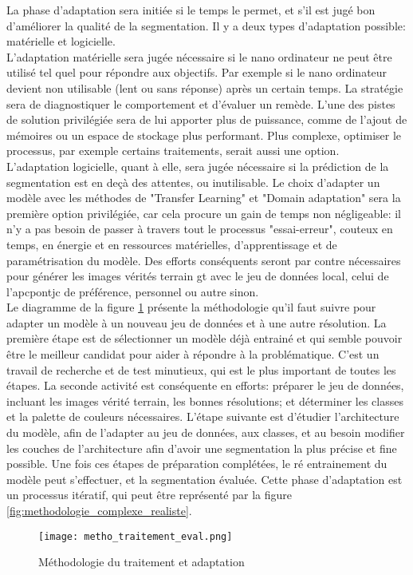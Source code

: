 ﻿\noindent La phase d'adaptation sera initiée si le temps le permet, et s'il est jugé bon d'améliorer la qualité de la segmentation. Il y a deux types d'adaptation possible: matérielle et logicielle.
\vspace{\baselineskip}
\\
\noindent L'adaptation matérielle sera jugée nécessaire si le nano ordinateur ne peut être utilisé tel quel pour répondre aux objectifs. Par exemple si le nano ordinateur devient non utilisable (lent ou sans réponse) après un certain temps. La stratégie sera de diagnostiquer le comportement et d'évaluer un remède. L'une des pistes de solution privilégiée sera de lui apporter plus de puissance, comme de l'ajout de mémoires ou un espace de stockage plus performant. Plus complexe, optimiser le processus, par exemple certains traitements, serait aussi une option.
\vspace{\baselineskip}
\\
\noindent L'adaptation logicielle, quant à elle, sera jugée nécessaire si la prédiction de la segmentation est en deçà des attentes, ou inutilisable. Le choix d'adapter un modèle avec les méthodes de "Transfer Learning" et "Domain adaptation" sera la première option privilégiée, car cela procure un gain de temps non négligeable: il n'y a pas besoin de passer à travers tout le processus "essai-erreur", couteux en temps, en énergie et en ressources matérielles, d'apprentissage et de paramétrisation du modèle. Des efforts conséquents seront par contre nécessaires pour générer les images vérités terrain \acrshort{gt} avec le jeu de données local, celui de l'\acrshort{apcpontjc} de préférence, personnel ou autre sinon.
\vspace{\baselineskip}
\\
\noindent Le diagramme de la figure \ref{fig:metho_adaptation} présente la méthodologie qu'il faut suivre pour adapter un modèle à un nouveau jeu de données et à une autre résolution. La première étape est de sélectionner un modèle déjà entrainé et qui semble pouvoir être le meilleur candidat pour aider à répondre à la problématique. C'est un travail de recherche et de test minutieux, qui est le plus important de toutes les étapes. La seconde activité est conséquente en efforts: préparer le jeu de données, incluant les images vérité terrain, les bonnes résolutions; et déterminer les classes et la palette de couleurs nécessaires. L'étape suivante est d'étudier l'architecture du modèle, afin de l'adapter au jeu de données, aux classes, et au besoin modifier les couches de l'architecture afin d'avoir une segmentation la plus précise et fine possible. Une fois ces étapes de préparation complétées, le ré entrainement du modèle peut s'effectuer, et la segmentation évaluée. Cette phase d'adaptation est un processus itératif, qui peut être représenté par la figure \ref{fig:methodologie_complexe_realiste}.
\label{metho_adaptation}
\begin{figure}[H]
    \centering
    \texttt{[image: metho\_traitement\_eval.png]}
    \caption{Méthodologie du traitement et adaptation}
    \label{fig:metho_adaptation}
\end{figure}